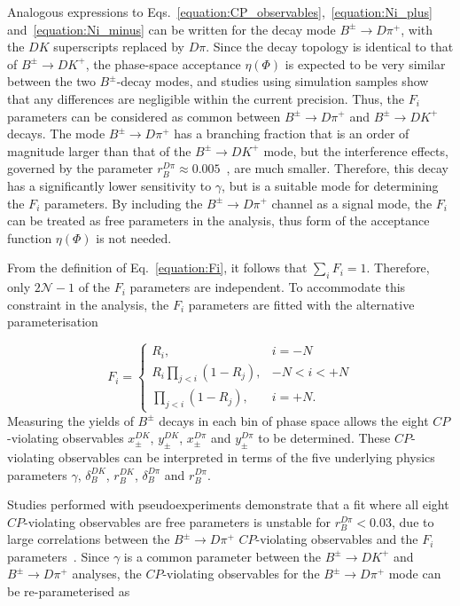\documentclass[12pt, a4paper, notitlepage, onecolumn]{article}
\begin{document}
Analogous expressions to Eqs.~\ref{equation:CP_observables},~\ref{equation:Ni_plus} and~\ref{equation:Ni_minus} can be written for the decay mode $B^\pm\to D\pi^+$, with the $DK$ superscripts replaced by $D\pi$. Since the decay topology is identical to that of $B^\pm\to DK^+$, the phase-space acceptance $\eta(\Phi)$ is expected to be very similar between the two $B^\pm$-decay modes, and studies using simulation samples show that any differences are negligible within the current precision. Thus, the $F_i$ parameters can be considered as common between $B^\pm\to D\pi^+$ and $B^\pm\to DK^+$ decays. The mode $B^\pm\to D\pi^+$ has a branching fraction that is an order of magnitude larger than that of the $B^\pm\to DK^+$ mode, but the interference effects, governed by the parameter $r_B^{D\pi}\approx 0.005$~\cite{LHCb-PAPER-2021-033}, are much smaller. Therefore, this decay has a significantly lower sensitivity to $\gamma$, but is a suitable mode for determining the $F_i$ parameters. By including the $B^\pm\to D\pi^+$ channel as a signal mode, the $F_i$ can be treated as free parameters in the analysis, thus form of the acceptance function $\eta(\Phi)$ is not needed.

From the definition of Eq.~\eqref{equation:Fi}, it follows that $\sum_iF_i = 1$. Therefore, only $2\mathcal{N} - 1$ of the $F_i$ parameters are independent. To accommodate this constraint in the analysis, the $F_i$ parameters are fitted with the alternative parameterisation

\begin{equation}
    F_i =
    \begin{cases}
        R_i, & i = -N \\
        R_i\prod_{j < i}(1 - R_j), & -N < i < +N \\
        \prod_{j < i}(1 - R_j), &i = +N.
    \end{cases}
\end{equation}
Measuring the yields of $B^\pm$ decays in each bin of phase space allows the eight $C\!P$-violating observables $x_\pm^{DK}$, $y_\pm^{DK}$, $x_\pm^{D\pi}$ and $y_\pm^{D\pi}$ to be determined. These $C\!P$-violating observables can be interpreted in terms of the five underlying physics parameters $\gamma$, $\delta_B^{DK}$, $r_B^{DK}$, $\delta_B^{D\pi}$ and $r_B^{D\pi}$.

Studies performed with pseudoexperiments demonstrate that a fit where all eight $C\!P$-violating observables are free parameters is unstable for $r_B^{D\pi} < 0.03$, due to large correlations between the $B^\pm\to D\pi^+$ $C\!P$-violating observables and the $F_i$ parameters~\cite{LHCb-PAPER-2020-019}. Since $\gamma$ is a common parameter between the $B^\pm\to DK^+$ and $B^\pm\to D\pi^+$ analyses, the $C\!P$-violating observables for the $B^\pm\to D\pi^+$ mode can be re-parameterised as
\end{document}
